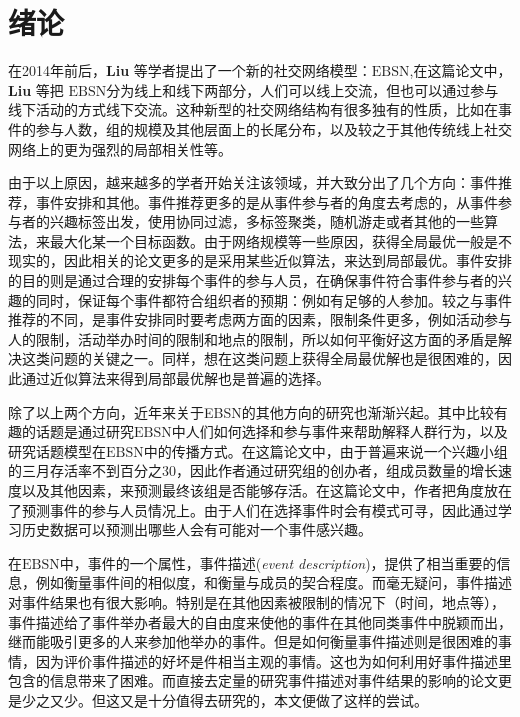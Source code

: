 \documentclass[]{template}
\begin{document}
\section{绪论} 
在2014年前后，\textbf{Liu} 等学者提出了一个新的社交网络模型：$\mathrm{EBSN}$\cite{EBSN_linking},在这篇论文中，\textbf{Liu} 等把 $\mathrm{EBSN}$分为线上和线下两部分，人们可以线上交流，但也可以通过参与线下活动的方式线下交流。这种新型的社交网络结构有很多独有的性质，比如在事件的参与人数，组的规模及其他层面上的长尾分布，以及较之于其他传统线上社交网络上的更为强烈的局部相关性等。

由于以上原因，越来越多的学者开始关注该领域，并大致分出了几个方向：事件推荐，事件安排和其他。事件推荐更多的是从事件参与者的角度去考虑的，从事件参与者的兴趣标签出发，使用协同过滤，多标签聚类，随机游走或者其他的一些算法，来最大化某一个目标函数。由于网络规模等一些原因，获得全局最优一般是不现实的，因此相关的论文更多的是采用某些近似算法，来达到局部最优\cite{EBSN_event_reco}\cite{EBSN_on_social}\cite{EBSN_event_recom2}。事件安排的目的则是通过合理的安排每个事件的参与人员，在确保事件符合事件参与者的兴趣的同时，保证每个事件都符合组织者的预期：例如有足够的人参加。较之与事件推荐的不同，是事件安排同时要考虑两方面的因素，限制条件更多，例如活动参与人的限制，活动举办时间的限制和地点的限制，所以如何平衡好这方面的矛盾是解决这类问题的关键之一\cite{EBSN_conflict-aware_2016}\cite{EBSN_feedback-aware_2017}\cite{EBSN_conflict-aware_2015}。同样，想在这类问题上获得全局最优解也是很困难的，因此通过近似算法来得到局部最优解也是普遍的选择。

除了以上两个方向，近年来关于EBSN的其他方向的研究也渐渐兴起。其中比较有趣的话题是通过研究$\mathrm{EBSN}$中人们如何选择和参与事件来帮助解释人群行为\cite{EBSN_understanding}，以及研究话题模型在$\mathrm{EBSN}$中的传播方式。在\cite{EBSN_can_i}这篇论文中，由于普遍来说一个兴趣小组的三月存活率不到百分之30，因此作者通过研究组的创办者，组成员数量的增长速度以及其他因素，来预测最终该组是否能够存活。在\cite{EBSN_who_will}这篇论文中，作者把角度放在了预测事件的参与人员情况上。由于人们在选择事件时会有模式可寻，因此通过学习历史数据可以预测出哪些人会有可能对一个事件感兴趣。

在$\mathrm{EBSN}$中，事件的一个属性，事件描述(\textit{event description})，提供了相当重要的信息，例如衡量事件间的相似度，和衡量与成员的契合程度。而毫无疑问，事件描述对事件结果也有很大影响。特别是在其他因素被限制的情况下（时间，地点等），事件描述给了事件举办者最大的自由度来使他的事件在其他同类事件中脱颖而出，继而能吸引更多的人来参加他举办的事件。但是如何衡量事件描述则是很困难的事情，因为评价事件描述的好坏是件相当主观的事情。这也为如何利用好事件描述里包含的信息带来了困难。而直接去定量的研究事件描述对事件结果的影响的论文更是少之又少。但这又是十分值得去研究的，本文便做了这样的尝试。
\end{document}
